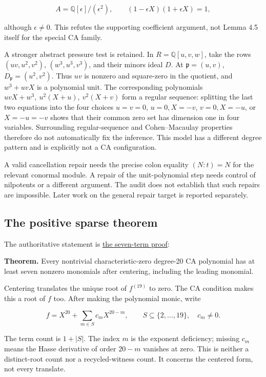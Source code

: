 \documentclass[
  british,
  10pt,
]{article}
\begin{document}
\[
A=\mathbb Q[\epsilon]/(\epsilon^2),\qquad
(1-\epsilon X)(1+\epsilon X)=1,
\]

although \(\epsilon\ne0\). This refutes the supporting coefficient
argument, not Lemma 4.5 itself for the special CA family.

A stronger abstract pressure test is retained. In
\(R=\mathbb Q[u,v,w]\), take the rows \((uv,u^2,v^2)\),
\((w^3,u^3,v^3)\), and their minors ideal \(D\). At
\(\mathfrak p=(u,v)\), \(D_{\mathfrak p}=(u^2,v^2)\). Thus \(uv\) is
nonzero and square-zero in the quotient, and \(w^3+uvX\) is a polynomial
unit. The corresponding polynomials \(uvX+w^3,\ u^2(X+u),\ v^2(X+v)\)
form a regular sequence: splitting the last two equations into the four
choices \(u=v=0\), \(u=0,X=-v\), \(v=0,X=-u\), or \(X=-u=-v\) shows that
their common zero set has dimension one in four variables. Surrounding
regular-sequence and Cohen--Macaulay properties therefore do not
automatically fix the inference. This model has a different degree
pattern and is explicitly not a CA configuration.

A valid cancellation repair needs the precise colon equality \((N:t)=N\)
for the relevant conormal module. A repair of the unit-polynomial step
needs control of nilpotents or a different argument. The audit does not
establish that such repairs are impossible. Later work on the general
repair target is reported separately.

\subsection{The positive sparse
theorem}\label{the-positive-sparse-theorem}

The authoritative statement is \href{evidence/seven-terms/PROOF.md}{the
seven-term proof}:

\textbf{Theorem.} Every nontrivial characteristic-zero degree-20 CA
polynomial has at least seven nonzero monomials after centering,
including the leading monomial.

Centering translates the unique root of \(f^{(19)}\) to zero. The CA
condition makes this a root of \(f\) too. After making the polynomial
monic, write

\[
f=X^{20}+\sum_{m\in S}c_mX^{20-m},\qquad
S\subseteq\{2,\ldots,19\},\quad c_m\ne0.
\]

The term count is \(1+|S|\). The index \(m\) is the exponent deficiency;
missing \(c_m\) means the Hasse derivative of order \(20-m\) vanishes at
zero. This is neither a distinct-root count nor a recycled-witness
count. It concerns the centered form, not every translate.
\end{document}
